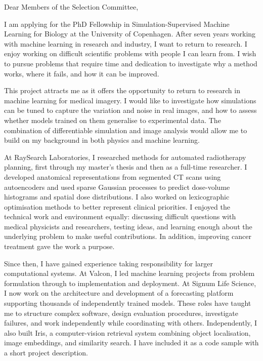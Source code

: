 \documentclass[11pt,a4paper]{moderncv}
\begin{document}
\makecvtitle
Dear Members of the Selection Committee,

\vspace*{2em}
I am applying for the PhD Fellowship in Simulation-Supervised Machine Learning for Biology at the University of Copenhagen. After seven years working with machine learning in research and industry, I want to return to research. I enjoy working on difficult scientific problems with people I can learn from. I wish to pursue problems that require time and dedication to investigate why a method works, where it fails, and how it can be improved. 

\vspace{4pt}
\hspace*{2em}
This project attracts me as it offers the opportunity to return to research in machine learning for medical imagery. I would like to investigate how simulations can be tuned to capture the variation and noise in real images, and how to assess whether models trained on them generalise to experimental data. The combination of differentiable simulation and image analysis would allow me to build on my background in both physics and machine learning.

\vspace{4pt}
\hspace*{2em}
At RaySearch Laboratories, I researched methods for automated radiotherapy planning, first through my master's thesis and then as a full-time researcher. I developed anatomical representations from segmented CT scans using autoencoders and used sparse Gaussian processes to predict dose-volume histograms and spatial dose distributions. I also worked on lexicographic optimisation methods to better represent clinical priorities. I enjoyed the technical work and environment equally: discussing difficult questions with medical physicists and researchers, testing ideas, and learning enough about the underlying problem to make useful contributions. In addition, improving cancer treatment gave the work a purpose.

\vspace{4pt}
\hspace*{2em}
Since then, I have gained experience taking responsibility for larger computational systems. At Valcon, I led machine learning projects from problem formulation through to implementation and deployment. At Signum Life Science, I now work on the architecture and development of a forecasting platform supporting thousands of independently trained models. These roles have taught me to structure complex software, design evaluation procedures, investigate failures, and work independently while coordinating with others. Independently, I also built Iris, a computer-vision retrieval system combining object localisation, image embeddings, and similarity search. I have included it as a code sample with a short project description.
\end{document}
